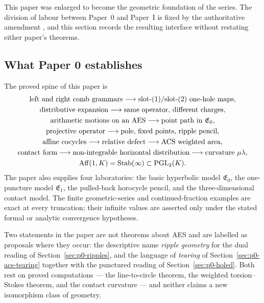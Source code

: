 This paper was enlarged to become the geometric foundation of the series.  The
division of labour between Paper~0 and Paper~I is fixed by the authoritative
amendment , and this
section records the resulting interface without restating either paper's
theorems.

\subsection{What Paper 0 establishes}

The proved spine of this paper is
\[
\begin{gathered}
  \text{left and right comb grammars}
  \longrightarrow
  \text{slot-$(1)$/slot-$(2)$ one-hole maps},\\
  \text{distributive expansion}
  \longrightarrow
  \text{same operator, different charges},\\
  \text{arithmetic motions on an AES}
  \longrightarrow
  \text{point path in } \mathfrak E_0,\\
  \text{projective operator}
  \longrightarrow
  \text{pole, fixed points, ripple pencil},\\
  \text{affine cocycles}
  \longrightarrow
  \text{relative defect}
  \longrightarrow
  \text{ACS weighted area},\\
  \text{contact form}
  \longrightarrow
  \text{non-integrable horizontal distribution}
  \longrightarrow
  \text{curvature } \mu\lambda,\\
  \operatorname{Aff}(1,K)=\operatorname{Stab}(\infty)
  \subset
  \operatorname{PGL}_2(K).
\end{gathered}
\]
The paper also supplies four laboratories: the basic hyperbolic model
$\mathfrak E_0$, the one-puncture model $\mathfrak E_1$, the pulled-back
horocycle pencil, and the three-dimensional contact model.  The finite
geometric-series and continued-fraction examples are exact at every truncation;
their infinite values are asserted only under the stated formal or analytic
convergence hypotheses.

Two statements in the paper are not theorems about AES and are labelled as
proposals where they occur: the descriptive name \emph{ripple geometry} for the dual
reading of Section~\ref{sec:p0-ripples}, and the language of \emph{tearing} of
Section~\ref{sec:p0-acs-tearing} together with the punctured reading of
Section~\ref{sec:p0-holed}.  Both rest on proved computations --- the
line-to-circle theorem, the weighted torsion--Stokes theorem, and the contact
curvature --- and neither claims a new isomorphism class of geometry.

